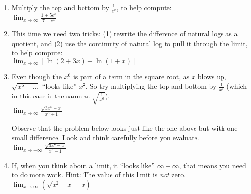 \documentclass[11pt,fleqn]{article}
\begin{document}
\setlength{\parindent}{0cm}
\renewcommand{\headrulewidth}{0pt}
\newcommand{\blank}[1]{\rule{#1}{0.75pt}}
\renewcommand{\d}{\displaystyle}
\vspace*{-0.7in}



  \begin{center}
  \large {}
\end{center}

\begin{enumerate}
  
  \item  Multiply the top and bottom by $\frac{1}{e^{x}}$, to help compute:\\
  
   $\d \lim_{x \to \infty} \frac{1 + 5e^x}{7 - e^x}$
    
\vfill    

    \item This time we need two tricks: (1) rewrite the difference of natural logs as a quotient, and (2) use the continuity of natural log to pull it through the limit, to help compute:\\
    
    $\d \lim_{x \to \infty} [ \ln (2 + 3x) - \ln (1+x) ]$
    
    \vfill
%    
%    
    

    
    \item  Even though the $x^{6}$ is part of a term in the square root, as $x$ blows up, $\sqrt{x^{6} + ...}$ ``looks like'' $x^{3}$. So try multiplying the top and bottom by $\frac{1}{x^{3}}$ (which in this case is the same as $\sqrt{\frac{1}{x^{6}}}$).\\
    
     $\d \lim_{x \to \infty} \frac{\sqrt{3x^6-x}}{x^3 + 1}$
     
     \vfill
     Observe that the problem below looks just like the one above but with one small difference. Look and think carefully before you evaluate. \\
     
     $\d \lim_{x \to -\infty} \frac{\sqrt{3x^6-x}}{x^3 + 1}$
     
     \vfill
     
     \newpage
     
     \item If, when you think about a limit, it ``looks like'' $\infty - \infty$, that means you need to do more work.    Hint: The value of this limit is \emph{not} zero.\\
     $\d \lim_{x \to \infty} (\sqrt{x^2+x} - x)$
     

\end{enumerate}
\end{document}

